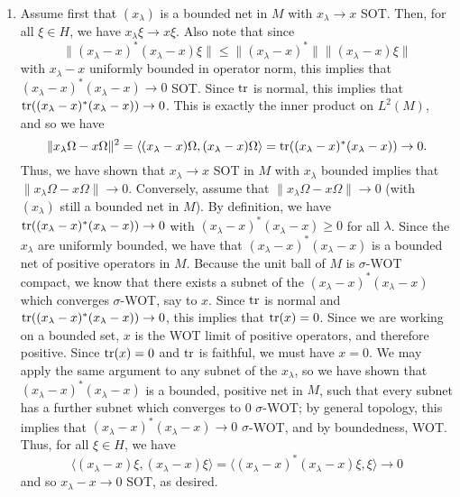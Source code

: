 \documentclass[a4paper,10pt]{report}
\begin{document}
\begin{enumerate}
		\begin{enumerate}
			\item Assume first that $(x_\lambda)$ is a bounded net in $M$ with $x_\lambda \rightarrow x$ SOT.  Then, for all $\xi\in H$, we have $x_\lambda \xi \rightarrow x\xi$.  Also note that since $$\|(x_\lambda - x)^* (x_\lambda - x)\xi \| \leq \|(x_\lambda - x)^*\| \|(x_\lambda - x)\xi \|$$ with $x_\lambda - x$ uniformly bounded in operator norm, this implies that $(x_\lambda - x)^*(x_\lambda - x) \rightarrow 0$ SOT.  Since $\operatorname{tr}$ is normal, this implies that $\operatorname{tr}((x_\lambda - x)^*(x_\lambda - x)) \rightarrow 0$.  This is exactly the inner product on $L^2(M)$, and so we have $$\|x_\lambda\Omega - x\Omega \|^2 =  \langle (x_\lambda - x)\Omega, (x_\lambda - x)\Omega \rangle = \operatorname{tr}((x_\lambda - x)^*(x_\lambda - x)) \rightarrow 0.$$ Thus, we have shown that $x_\lambda \rightarrow x$ SOT in $M$ with $x_\lambda$ bounded implies that $\|x_\lambda\Omega - x\Omega \| \rightarrow 0$.
			\newline
			\newline 
				Conversely, assume that $\|x_\lambda\Omega - x\Omega \|\rightarrow 0$ (with $(x_\lambda)$ still a bounded net in $M$).
			 By definition, we have $\operatorname{tr}((x_\lambda - x)^*(x_\lambda - x)) \rightarrow 0$ with $(x_\lambda - x)^*(x_\lambda - x) \geq 0$ for all $\lambda$. 
				Since the $x_\lambda$ are uniformly bounded, we have that $(x_\lambda - x)^*(x_\lambda - x)$ is a bounded net of positive operators in $M$. 
				Because the unit ball of $M$ is $\sigma$-WOT compact, we know that there exists a subnet of the $(x_\lambda - x)^*(x_\lambda - x)$ which converges $\sigma$-WOT, say to $x$.  Since $\operatorname{tr}$ is normal and $\operatorname{tr}((x_\lambda - x)^*(x_\lambda - x)) \rightarrow 0$, this implies that $\operatorname{tr}(x) = 0$.  
				Since we are working on a bounded set, $x$ is the WOT limit of positive operators, and therefore positive. 
				Since $\operatorname{tr}(x)=0$ and $\operatorname{tr}$ is faithful, we must have $x=0$. 
				We may apply the same argument to any subnet of the $x_\lambda$, so we have shown that $(x_\lambda - x)^*(x_\lambda - x)$ is a bounded, positive net in $M$, such that every subnet has a further subnet which converges to $0$ $\sigma$-WOT; by general topology, this implies that $(x_\lambda-x)^*(x_\lambda-x)\to 0$ $\sigma$-WOT, and by boundedness, WOT. 
			 Thus, for all $\xi\in H$, we have $$\langle (x_\lambda - x)\xi, (x_\lambda - x)\xi \rangle = \langle (x_\lambda - x)^*(x_\lambda - x)\xi,\xi \rangle \rightarrow 0$$ and so $x_\lambda - x \rightarrow 0$ SOT, as desired. 

\end{enumerate}
\end{enumerate}
\end{document}
